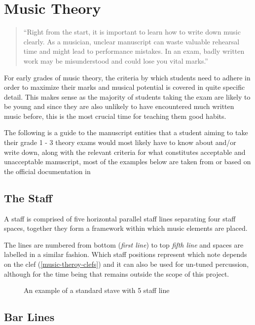 \section{Music Theory}

\blockquote{``Right from the start, it is important to learn how to write down music clearly. As a musician, unclear manuscript can waste valuable rehearsal time and might lead to performance mistakes. In an exam, badly written work may be misunderstood and could lose you vital marks.'' \parencite{taylor1989ab}}

For early grades of music theory, the criteria by which students need to adhere in order to maximize their marks and musical potential is covered in quite specific detail. This makes sense as the majority of students taking the exam are likely to be young and since they are also unlikely to have encountered much written music before, this is the most crucial time for teaching them good habits.

The following is a guide to the manuscript entities that a student aiming to take their grade 1 - 3 theory exams would most likely have to know about and/or write down, along with the relevant criteria for what constitutes acceptable and unacceptable manuscript, most of the examples below are taken from or based on the official documentation in \parencite{taylor2008music}

\subsection{The Staff}
\label{sec:music-theory-staff}
A staff is comprised of five horizontal parallel staff lines separating four staff spaces, together they form a framework within which music elements are placed.

The lines are numbered from bottom (\emph{first line}) to top \emph{fifth line} and spaces are labelled in a similar fashion. Which staff positions represent which note depends on the clef (\cref{music-theroy-clefs}) and it can also be used for un-tuned percussion, although for the time being that remains outside the scope of this project.

\begin{figure}[H]
  \centering
  \caption{An example of a standard stave with 5 staff line}
\end{figure}

\subsection{Bar Lines}

